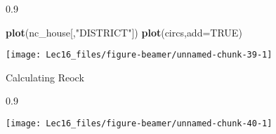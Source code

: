 \documentclass[11pt,ignorenonframetext,]{beamer}
\newenvironment{Shaded}{}{}
\newcommand{\DataTypeTok}[1]{\textcolor[rgb]{0.56,0.13,0.00}{#1}}
\newcommand{\KeywordTok}[1]{\textcolor[rgb]{0.00,0.44,0.13}{\textbf{#1}}}
\newcommand{\NormalTok}[1]{#1}
\newcommand{\OperatorTok}[1]{\textcolor[rgb]{0.40,0.40,0.40}{#1}}
\newcommand{\OtherTok}[1]{\textcolor[rgb]{0.00,0.44,0.13}{#1}}
\newcommand{\StringTok}[1]{\textcolor[rgb]{0.25,0.44,0.63}{#1}}
\let\oldShaded\Shaded
\let\endoldShaded\endShaded
\renewenvironment{Shaded}{\footnotesize\begin{spacing}{0.9}\oldShaded}{\endoldShaded\end{spacing}}
\begin{document}
\begin{frame}[fragile]{}
\protect\hypertarget{section-5}{}

\begin{Shaded}
\begin{Highlighting}[]
\KeywordTok{plot}\NormalTok{(nc_house[,}\StringTok{"DISTRICT"}\NormalTok{])}
\KeywordTok{plot}\NormalTok{(circs,}\DataTypeTok{add=}\OtherTok{TRUE}\NormalTok{)}
\end{Highlighting}
\end{Shaded}

\begin{center}\texttt{[image: Lec16\_files/figure-beamer/unnamed-chunk-39-1]} \end{center}

\end{frame}

\begin{frame}[fragile]{Calculating Reock}
\protect\hypertarget{calculating-reock}{}

\begin{Shaded}
\end{Shaded}

\begin{center}\texttt{[image: Lec16\_files/figure-beamer/unnamed-chunk-40-1]} \end{center}

\end{frame}
\end{document}
